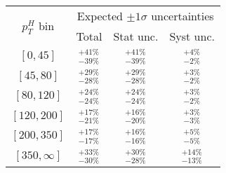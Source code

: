 \begin{tabular}{c|ccc}
  \hline
  \multirow{2}{*}{$p_T^H$ bin} & \multicolumn{3}{c}{Expected $\pm1\sigma$ uncertainties} \\ 
  & Total & Stat unc. & Syst unc. \\ \hline 
  $[0,45]$  & $^{+41\%}_{-39\%}$ & $^{+41\%}_{-39\%}$ & $^{+4\%}_{-2\%}$ \\
  $[45,80]$  & $^{+29\%}_{-28\%}$ & $^{+29\%}_{-28\%}$ & $^{+3\%}_{-2\%}$ \\
  $[80,120]$  & $^{+24\%}_{-24\%}$ & $^{+24\%}_{-24\%}$ & $^{+3\%}_{-2\%}$ \\
  $[120,200]$  & $^{+17\%}_{-21\%}$ & $^{+16\%}_{-20\%}$ & $^{+3\%}_{-3\%}$ \\
  $[200,350]$  & $^{+17\%}_{-17\%}$ & $^{+16\%}_{-16\%}$ & $^{+5\%}_{-5\%}$ \\
  $[350,\infty]$  & $^{+33\%}_{-30\%}$ & $^{+30\%}_{-28\%}$ & $^{+14\%}_{-13\%}$ \\
  \hline
\end{tabular}